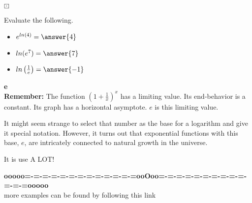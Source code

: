 \documentclass{ximera}
\begin{document}
\begin{question}$\boxdot$

Evaluate the following.

\begin{itemize}
\item $e^{ln(4)} = \answer{4}$ 
\item $ln(e^7) = \answer{7}$
\item $ln\left( \frac{1}{e} \right) = \answer{-1}$
\end{itemize}



\end{question}



\begin{remark} \textbf{\textcolor{purple!85!blue}{e}} \\

\textbf{\textcolor{blue!55!black}{Remember:}} The function $\left( 1 + \frac{1}{x}  \right)^{x}$ has a limiting value.  Its end-behavior is a constant.  Its graph has a horizontal asymptote.  $e$ is this limiting value.

It might seem strange to select that number as the base for a logarithm and give it special notation.  However, it turns out that exponential functions with this base, $e$, are intricately connected to natural growth in the universe.

It is use A LOT!
\end{remark}










\begin{center}
\textbf{\textcolor{green!50!black}{ooooo=-=-=-=-=-=-=-=-=-=-=-=-=ooOoo=-=-=-=-=-=-=-=-=-=-=-=-=ooooo}} \\

more examples can be found by following this link\\ 

\end{center}
\end{document}
